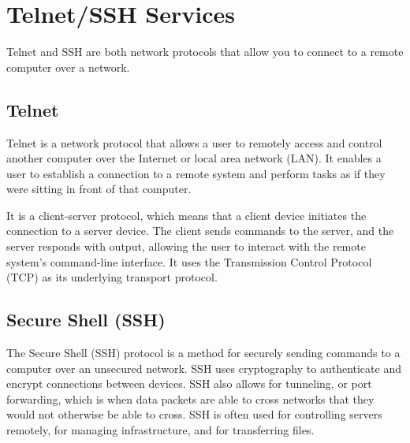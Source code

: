 \documentclass[12pt,titlepage]{article}
\begin{document}
\pagebreak

\section{Telnet/SSH Services}

Telnet and SSH are both network protocols that allow you to connect to a remote computer over a network.

\subsection{Telnet}

Telnet is a network protocol that allows a user to remotely access and control another computer over the Internet or local area network (LAN). It enables a user to establish a connection to a remote system and perform tasks as if they were sitting in front of that computer.

It is a client-server protocol, which means that a client device initiates the connection to a server device. The client sends commands to the server, and the server responds with output, allowing the user to interact with the remote system’s command-line interface. It uses the Transmission Control Protocol (TCP) as its underlying transport protocol.

\subsection{Secure Shell (SSH)}

The Secure Shell (SSH) protocol is a method for securely sending commands to a computer over an
unsecured network. SSH uses cryptography to authenticate and encrypt connections between devices.
SSH also allows for tunneling, or port forwarding, which is when data packets are able to cross
networks that they would not otherwise be able to cross. SSH is often used for controlling servers
remotely, for managing infrastructure, and for transferring files.
\end{document}
